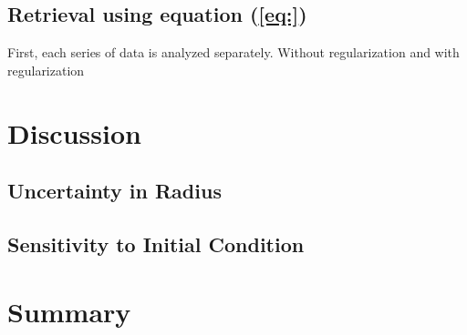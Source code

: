 \documentclass[iop,numberedappendix,apj,]{emulateapj}
\begin{document}
\subsection{Retrieval using equation (\ref{eq:}) }
\label{ss:retrieval}

First, each series of data is analyzed separately. 
Without regularization and with regularization

\section{Discussion}
\label{s:discussion}


\subsection{Uncertainty in Radius}
\label{ss:radius}

\subsection{Sensitivity to Initial Condition}
\label{ss:initialcondition}


\section{Summary}
\label{s:summary}




\acknowledgments


\end{document}
